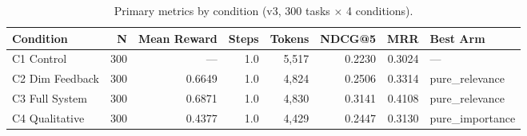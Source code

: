 \begin{table}[htbp]
\centering
\caption{Primary metrics by condition (v3, 300 tasks $\times$ 4 conditions).}
\label{tab:primary-metrics}
\begin{tabular}{lrrrrrrl}
\toprule
Condition & N & Mean Reward & Steps & Tokens & NDCG@5 & MRR & Best Arm \\
\midrule
  C1 Control & 300 & --- & 1.0 & 5,517 & 0.2230 & 0.3024 & --- \\
  C2 Dim Feedback & 300 & 0.6649 & 1.0 & 4,824 & 0.2506 & 0.3314 & pure_relevance \\
  C3 Full System & 300 & 0.6871 & 1.0 & 4,830 & 0.3141 & 0.4108 & pure_relevance \\
  C4 Qualitative & 300 & 0.4377 & 1.0 & 4,429 & 0.2447 & 0.3130 & pure_importance \\
\bottomrule
\end{tabular}
\end{table}